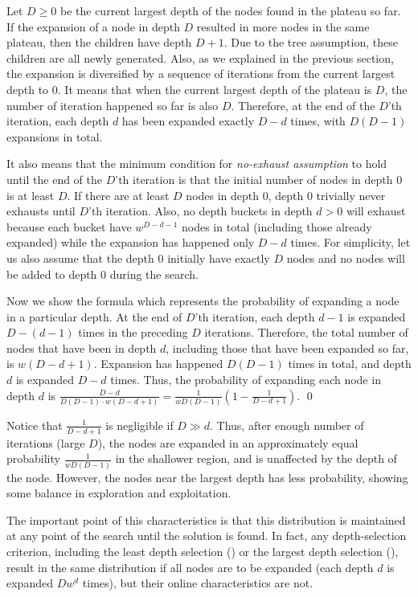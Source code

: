 Let $D\geq 0$ be the current largest depth of the nodes found in the plateau so far.  If the expansion of a node in
depth $D$ resulted in more nodes in the same plateau, then the children have depth $D+1$.  Due to the tree
assumption, these children are all newly generated. Also, as we explained in the previous section, the expansion is
diversified by a sequence of iterations from the current largest depth to 0.  It means that when the current
largest depth of the plateau is $D$, the number of iteration happened so far is also $D$.
Therefore, at the end of the $D$'th iteration, each depth $d$ has been expanded exactly $D-d$ times, with $D(D-1)$
expansions in total.

It also means that the minimum condition for \emph{no-exhaust assumption} to hold until the end of the $D$'th
iteration is that the initial number of nodes in depth 0 is at least $D$.  If there are at least $D$ nodes in depth
0, depth 0 trivially never exhausts until $D$'th iteration. Also, no depth buckets in depth $d>0$ will exhaust
because each bucket have $w^{D-d-1}$ nodes in total (including those already expanded) while the expansion has
happened only $D-d$ times. For simplicity, let us also assume that the depth 0 initially have exactly $D$ nodes and
no nodes will be added to depth 0 during the search.

Now we show the formula which represents the probability of expanding a node in a particular depth.
At the end of $D$'th iteration,
each depth $d-1$ is expanded $D-(d-1)$ times in the preceding $D$ iterations.
Therefore, the total number of nodes that have been in depth $d$, including those
that have been expanded so far, is $w(D-d+1)$.
Expansion has happened $D(D-1)$ times in total, and depth $d$ is expanded $D-d$ times.
Thus, the probability of expanding each node in depth $d$ is
$\frac{D-d}{D(D-1)\cdot w(D-d+1)}=\frac{1}{wD(D-1)}(1-\frac{1}{D-d+1})$.  \qed

Notice that $\frac{1}{D-d+1}$ is negligible if $D \gg d$.
Thus, after enough number of iterations (large $D$), the nodes are 
expanded in an approximately equal probability $\frac{1}{wD(D-1)}$ in the shallower region, and is
unaffected by the depth of the node.
However, the nodes near the largest depth has less probability, showing
some balance in exploration and exploitation.

The important point of this characteristics is that this distribution is maintained at any point of the search
until the solution is found. In fact, any depth-selection criterion, including the least depth selection (\fifo) or
the largest depth selection (\lifo), result in the same distribution if all nodes are to be expanded (each depth
$d$ is expanded $Dw^d$ times), but their online characteristics are not.
%
